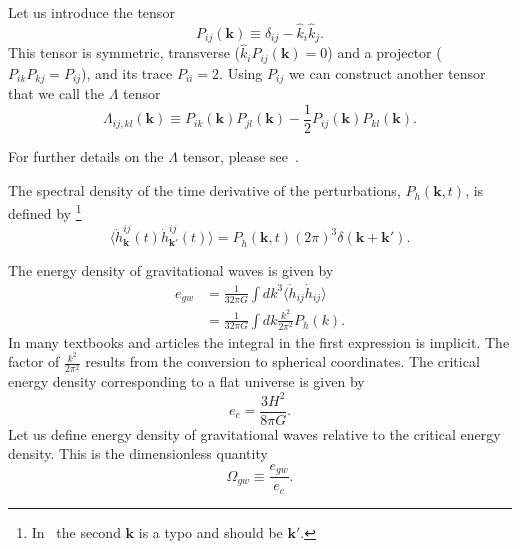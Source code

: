 Let us introduce the tensor
\cite[eq. 1.35]{maggiore_gw_2008}
\begin{equation}
P_{ij}(\bm{k}) \equiv \delta_{ij} - \hat{k}_i \hat{k}_j.
\end{equation}
This tensor is symmetric, transverse ($\hat{k}_i P_{ij}(\bm{k}) = 0$) and a projector ($P_{ik}P_{kj} = P_{ij}$), and its trace $P_{ii} = 2$.
Using $P_{ij}$ we can construct another tensor that we call the $\Lambda$ tensor
\cite[eq. 1.36]{maggiore_gw_2008}
\begin{equation}
\Lambda_{ij,kl}(\bm{k}) \equiv P_{ik}(\bm{k}) P_{jl}(\bm{k}) - \frac{1}{2} P_{ij}(\bm{k}) P_{kl}(\bm{k}).
\label{eq:Lambda}
\end{equation}

For further details on the $\Lambda$ tensor, please see~\cite[ch. 1.2]{maggiore_gw_2008}.

The spectral density of the time derivative of the perturbations, $P_{\dot{h}}(\bm{k},t)$, is defined by
\cite[eq. 3.4]{hindmarsh_gw_pt_2019}%
\footnote{In~\cite[eq. 3.4]{hindmarsh_gw_pt_2019} the second $\mathbf{k}$ is a typo and should be $\mathbf{k}'$.}
\begin{equation}
\langle \dot{h}_{\bm{k}}^{ij}(t) \dot{h}_{\bm{k}'}^{ij}(t) \rangle = P_{\dot{h}}(\bm{k},t) (2\pi)^3 \delta (\bm{k} + \bm{k}').
\label{eq:hbracket}
\end{equation}

The energy density of gravitational waves is given by
\cites[eq. 3.3]{hindmarsh_gw_pt_2019}[eq. 1.135, 7.193]{maggiore_gw_2008}
\begin{align}
e_{gw}
&= \frac{1}{32 \pi G} \int dk^3 \langle \dot{h}_{ij} \dot{h}_{ij} \rangle \\
&= \frac{1}{32 \pi G} \int dk \frac{k^2}{2 \pi^2} P_{\dot{h}}(k).
\end{align}
In many textbooks and articles the integral in the first expression is implicit.
The factor of $\frac{k^2}{2\pi^2}$ results from the conversion to spherical coordinates.
The critical energy density corresponding to a flat universe is given by
\cite[eq. 7.196]{maggiore_gw_2008}
\begin{equation}
e_c = \frac{3 H^2}{8 \pi G}.
\label{eq:e_crit}
\end{equation}
Let us define energy density of gravitational waves relative to the critical energy density.
This is the dimensionless quantity
\begin{equation}
\Omega_{gw} \equiv \frac{e_{gw}}{e_c}.
\label{eq:omega_gw}
\end{equation}

